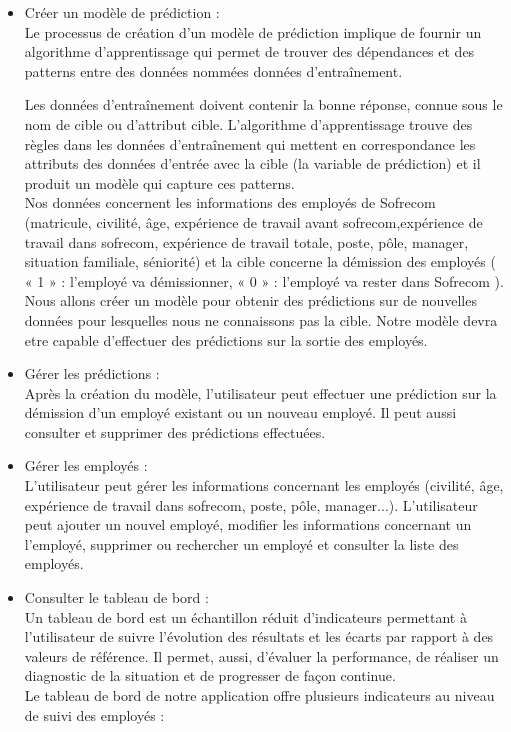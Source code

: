        \begin{itemize}
    \item Créer un modèle de prédiction : \\
    Le processus de création d'un modèle de prédiction implique de fournir un algorithme d'apprentissage qui permet de trouver des dépendances et des patterns entre des données nommées données d'entraînement.
    
    Les données d'entraînement doivent contenir la bonne réponse, connue sous le nom de cible ou d'attribut cible. L'algorithme d'apprentissage trouve des règles dans les données d'entraînement qui mettent en correspondance les attributs des données d'entrée avec la cible (la variable de prédiction) et il produit un modèle qui capture ces patterns.\\
    Nos données concernent les informations des employés de Sofrecom (matricule, civilité, âge, expérience de travail avant sofrecom,expérience de travail dans sofrecom, expérience de travail totale, poste, pôle, manager, situation familiale, séniorité) et la cible concerne la démission des employés ( « 1 » : l'employé va démissionner,   « 0 » : l’employé va rester dans Sofrecom  ).\\ Nous allons  créer un modèle pour obtenir des prédictions sur de nouvelles données pour lesquelles nous ne connaissons pas la cible. Notre modèle devra etre capable d'effectuer des prédictions sur la sortie des employés.
  \\
   \item Gérer les prédictions : \\
 Après la création du modèle, l'utilisateur peut effectuer une prédiction sur la démission d'un employé existant ou un nouveau employé. Il peut aussi consulter et supprimer des prédictions effectuées.
  \\
   \item Gérer les employés : \\
  L'utilisateur peut gérer les informations concernant les employés (civilité, âge, expérience de travail dans sofrecom, poste, pôle, manager...). L’utilisateur peut ajouter un nouvel employé,
modifier les informations concernant un l'employé, supprimer ou rechercher un employé et consulter la liste des employés.
      \\
      \newpage
         \item Consulter le tableau de bord : \\
Un tableau de bord est un échantillon réduit d'indicateurs permettant à l’utilisateur de suivre l'évolution des résultats et les écarts par rapport à des valeurs de référence. Il permet, aussi, d’évaluer la performance, de réaliser un diagnostic de la situation et de progresser de façon continue.
\\
Le tableau de bord de notre application offre plusieurs indicateurs au niveau de suivi des employés : 


\end{itemize}
